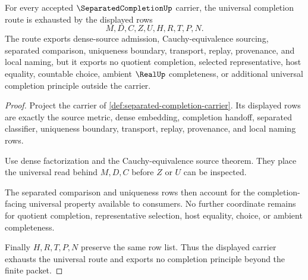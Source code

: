 \begin{theorem}
\label{thm:separatedcompletion-universal-route-exhaustion}
For every accepted $\SeparatedCompletionUp$ carrier, the universal completion route is exhausted by the displayed rows
$$
M,D,C,Z,U,H,R,T,P,N .
$$
The route exports dense-source admission, Cauchy-equivalence sourcing, separated comparison, uniqueness boundary, transport, replay, provenance, and local naming, but it exports no quotient completion, selected representative, host equality, countable choice, ambient $\RealUp$ completeness, or additional universal completion principle outside the carrier.
\end{theorem}
\begin{proof}
Project the carrier of \autoref{def:separated-completion-carrier}. Its displayed rows are exactly the source metric, dense embedding, completion handoff, separated classifier, uniqueness boundary, transport, replay, provenance, and local naming rows.

Use dense factorization and the Cauchy-equivalence source theorem. They place the universal read behind $M,D,C$ before $Z$ or $U$ can be inspected.

The separated comparison and uniqueness rows then account for the completion-facing universal property available to consumers. No further coordinate remains for quotient completion, representative selection, host equality, choice, or ambient completeness.

Finally $H,R,T,P,N$ preserve the same row list. Thus the displayed carrier exhausts the universal route and exports no completion principle beyond the finite packet.
\end{proof}

